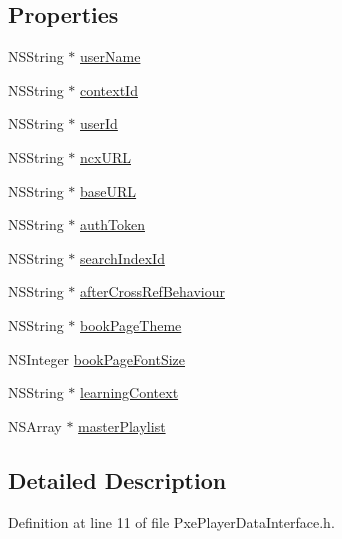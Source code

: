 \subsection*{Properties}
\begin{DoxyCompactItemize}
\item 
N\-S\-String $\ast$ \hyperlink{interface_pxe_player_data_interface_a772cc60134527bb2faa87f197de4e3cc}{user\-Name}
\item 
N\-S\-String $\ast$ \hyperlink{interface_pxe_player_data_interface_adeded8526816f9d96dd088511d4046d3}{context\-Id}
\item 
N\-S\-String $\ast$ \hyperlink{interface_pxe_player_data_interface_a9b508aa7db14e8852cf251308312db25}{user\-Id}
\item 
N\-S\-String $\ast$ \hyperlink{interface_pxe_player_data_interface_ade76fc35011aade53e15ffa5414fc153}{ncx\-U\-R\-L}
\item 
N\-S\-String $\ast$ \hyperlink{interface_pxe_player_data_interface_a0c22a98d7e29a36bcf024bb58c58aad8}{base\-U\-R\-L}
\item 
N\-S\-String $\ast$ \hyperlink{interface_pxe_player_data_interface_a98548be4b0f323ff768a5bf22f3f11c1}{auth\-Token}
\item 
N\-S\-String $\ast$ \hyperlink{interface_pxe_player_data_interface_a6e1589797ac4e892d34cbfcac8de6b89}{search\-Index\-Id}
\item 
N\-S\-String $\ast$ \hyperlink{interface_pxe_player_data_interface_a3a406ada658778aecd037ebe9bde9cb9}{after\-Cross\-Ref\-Behaviour}
\item 
N\-S\-String $\ast$ \hyperlink{interface_pxe_player_data_interface_ac749acf5d0492c35a160be17973cab81}{book\-Page\-Theme}
\item 
N\-S\-Integer \hyperlink{interface_pxe_player_data_interface_a01914ef4755b7862ba543a0659613152}{book\-Page\-Font\-Size}
\item 
N\-S\-String $\ast$ \hyperlink{interface_pxe_player_data_interface_a5d758a740c14531a20e76f60ad3d7893}{learning\-Context}
\item 
N\-S\-Array $\ast$ \hyperlink{interface_pxe_player_data_interface_a782e29876259f6a3f6571794356503e0}{master\-Playlist}
\end{DoxyCompactItemize}


\subsection{Detailed Description}


Definition at line 11 of file Pxe\-Player\-Data\-Interface.\-h.



